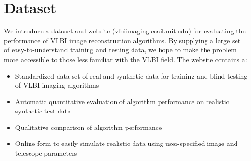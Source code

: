 



\section{Dataset}
\label{section:dataset}

We introduce a dataset and website (\url{vlbiimaging.csail.mit.edu}) for evaluating the performance of VLBI image reconstruction algorithms. 
By supplying a large set of easy-to-understand training and testing data, we hope to make the problem more accessible to those less familiar with the VLBI field. 
The website contains a:

\begin{itemize}[leftmargin=*]
\item  \vspace{-.1in} Standardized data set of real and synthetic data for training and blind testing of VLBI imaging algorithms
\item  \vspace{-.1in} Automatic quantitative evaluation of algorithm performance on realistic synthetic test data
\item  \vspace{-.1in} Qualitative comparison of algorithm performance 
\item  \vspace{-.1in} Online form to easily simulate realistic data using user-specified image and telescope parameters \vspace{-.05in}
\end{itemize}




